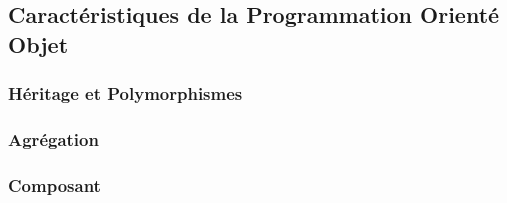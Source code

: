 \subsection{Caractéristiques de la Programmation Orienté Objet}
\subsubsection{Héritage et Polymorphismes}
\subsubsection{Agrégation}
\subsubsection{Composant}

%
